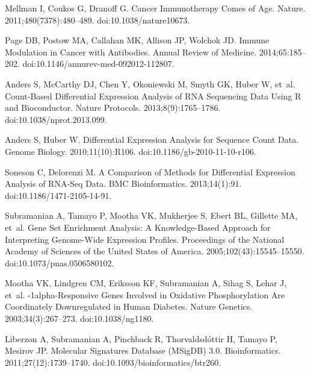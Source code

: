 \documentclass[10pt,letterpaper]{article}
\begin{document}
\begin{thebibliography}{10}
Mellman I, Coukos G, Dranoff G.
\newblock Cancer Immunotherapy Comes of Age.
\newblock Nature. 2011;480(7378):480--489.
\newblock doi:{10.1038/nature10673}.

Page DB, Postow MA, Callahan MK, Allison JP, Wolchok JD.
\newblock Immune Modulation in Cancer with Antibodies.
\newblock Annual Review of Medicine. 2014;65:185--202.
\newblock doi:{10.1146/annurev-med-092012-112807}.

Anders S, McCarthy DJ, Chen Y, Okoniewski M, Smyth GK, Huber W, et~al.
\newblock Count-Based Differential Expression Analysis of {{RNA}} Sequencing
Data Using {{R}} and {{Bioconductor}}.
\newblock Nature Protocols. 2013;8(9):1765--1786.
\newblock doi:{10.1038/nprot.2013.099}.

Anders S, Huber W.
\newblock Differential Expression Analysis for Sequence Count Data.
\newblock Genome Biology. 2010;11(10):R106.
\newblock doi:{10.1186/gb-2010-11-10-r106}.

Soneson C, Delorenzi M.
\newblock A Comparison of Methods for Differential Expression Analysis of
{{RNA}}-Seq Data.
\newblock BMC Bioinformatics. 2013;14(1):91.
\newblock doi:{10.1186/1471-2105-14-91}.

Subramanian A, Tamayo P, Mootha VK, Mukherjee S, Ebert BL, Gillette MA, et~al.
\newblock Gene Set Enrichment Analysis: A Knowledge-Based Approach for
Interpreting Genome-Wide Expression Profiles.
\newblock Proceedings of the National Academy of Sciences of the United States
of America. 2005;102(43):15545--15550.
\newblock doi:{10.1073/pnas.0506580102}.

Mootha VK, Lindgren CM, Eriksson KF, Subramanian A, Sihag S, Lehar J, et~al.
-1alpha-Responsive Genes Involved in Oxidative Phosphorylation
Are Coordinately Downregulated in Human Diabetes.
\newblock Nature Genetics. 2003;34(3):267--273.
\newblock doi:{10.1038/ng1180}.

Liberzon A, Subramanian A, Pinchback R, Thorvaldsd{\'o}ttir H, Tamayo P,
Mesirov JP.
\newblock Molecular Signatures Database ({{MSigDB}}) 3.0.
\newblock Bioinformatics. 2011;27(12):1739--1740.
\newblock doi:{10.1093/bioinformatics/btr260}.


\end{thebibliography}
\end{document}
